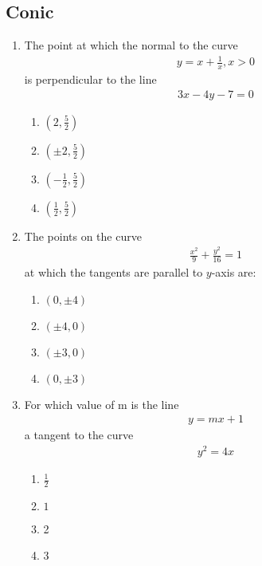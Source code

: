 \documentclass{article}
\providecommand{\brak}[1]{\ensuremath{\left(#1\right)}}
\begin{document}
\begin{center}
    \section{Conic}
    \begin{enumerate}
        
\item The point at which the normal to the curve 
\begin{align}
    y = x+\frac{1}{x}, x>0 
\end{align}
 is perpendicular to the line
 \begin{align}
     3x-4y-7 = 0 
 \end{align}
\begin{enumerate}
    \item $\brak{2,\frac{5}{2}}$   \item $\brak{\pm2,\frac{5}{2}}$  

         \item $\brak{-\frac{1}{2},\frac{5}{2}}$    \item $\brak{\frac{1}{2},\frac{5}{2}}$
\end{enumerate}
         
         \item The points on the curve
         \begin{align}
             \frac{x^2}{9} +\frac{y^2}{16} = 1
         \end{align}
         at which the tangents are parallel to $y$-axis are:
         \begin{enumerate}
             \item $\brak{0,\pm4}$   \item $\brak{\pm4,0}$  

         \item  $\brak{\pm3,0}$   \item $\brak{0,\pm3}$
         \end{enumerate}
           
         \item For which value of m is the line
         \begin{align}
            y = mx + 1 
         \end{align}a tangent to the curve 
        \begin{align}
            y^2 = 4x 
        \end{align}
        \begin{enumerate}
            \item  $\frac{1}{2}$  \item $1$

         \item 2  \item 3
        \end{enumerate}
    \end{enumerate}
\end{center}
\end{document}
